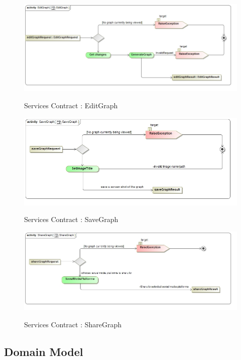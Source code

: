 \documentclass[a4paper,12pt]{article}
\begin{document}
		\begin{figure}[H]
		\includegraphics[width=\textwidth]{Images/act__EditGraph}  \\
		\caption{Services Contract : EditGraph}
	\end{figure}
	
	\begin{figure}[H]
		\includegraphics[width=\textwidth]{Images/act__SaveGraph}  \\
		\caption{Services Contract : SaveGraph}
	\end{figure}
	
	\begin{figure}[H]
		\includegraphics[width=\textwidth]{Images/act__ShareGraph}  \\
		\caption{Services Contract : ShareGraph}
	\end{figure}

\subsection{Domain Model}
\end{document}
